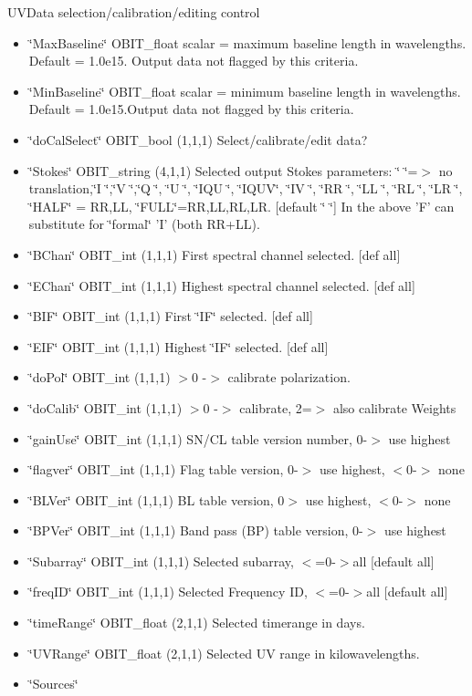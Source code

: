 UVData selection/calibration/editing control \begin{itemize}
\item \char`\"{}Max\-Baseline\char`\"{} OBIT\_\-float scalar = maximum baseline length in wavelengths. Default = 1.0e15. Output data not flagged by this criteria. \item \char`\"{}Min\-Baseline\char`\"{} OBIT\_\-float scalar = minimum baseline length in wavelengths. Default = 1.0e15.Output data not flagged by this criteria. \item \char`\"{}do\-Cal\-Select\char`\"{} OBIT\_\-bool (1,1,1) Select/calibrate/edit data? \item \char`\"{}Stokes\char`\"{} OBIT\_\-string (4,1,1) Selected output Stokes parameters: \char`\"{}    \char`\"{}=$>$ no translation,\char`\"{}I   \char`\"{},\char`\"{}V   \char`\"{},\char`\"{}Q   \char`\"{}, \char`\"{}U   \char`\"{}, \char`\"{}IQU \char`\"{}, \char`\"{}IQUV\char`\"{}, \char`\"{}IV  \char`\"{}, \char`\"{}RR  \char`\"{}, \char`\"{}LL  \char`\"{}, \char`\"{}RL  \char`\"{}, \char`\"{}LR  \char`\"{}, \char`\"{}HALF\char`\"{} = RR,LL, \char`\"{}FULL\char`\"{}=RR,LL,RL,LR. [default \char`\"{}    \char`\"{}] In the above 'F' can substitute for \char`\"{}formal\char`\"{} 'I' (both RR+LL). \item \char`\"{}BChan\char`\"{} OBIT\_\-int (1,1,1) First spectral channel selected. [def all] \item \char`\"{}EChan\char`\"{} OBIT\_\-int (1,1,1) Highest spectral channel selected. [def all] \item \char`\"{}BIF\char`\"{} OBIT\_\-int (1,1,1) First \char`\"{}IF\char`\"{} selected. [def all] \item \char`\"{}EIF\char`\"{} OBIT\_\-int (1,1,1) Highest \char`\"{}IF\char`\"{} selected. [def all] \item \char`\"{}do\-Pol\char`\"{} OBIT\_\-int (1,1,1) $>$0 -$>$ calibrate polarization. \item \char`\"{}do\-Calib\char`\"{} OBIT\_\-int (1,1,1) $>$0 -$>$ calibrate, 2=$>$ also calibrate Weights \item \char`\"{}gain\-Use\char`\"{} OBIT\_\-int (1,1,1) SN/CL table version number, 0-$>$ use highest \item \char`\"{}flagver\char`\"{} OBIT\_\-int (1,1,1) Flag table version, 0-$>$ use highest, $<$0-$>$ none \item \char`\"{}BLVer\char`\"{} OBIT\_\-int (1,1,1) BL table version, 0$>$ use highest, $<$0-$>$ none \item \char`\"{}BPVer\char`\"{} OBIT\_\-int (1,1,1) Band pass (BP) table version, 0-$>$ use highest \item \char`\"{}Subarray\char`\"{} OBIT\_\-int (1,1,1) Selected subarray, $<$=0-$>$all [default all] \item \char`\"{}freq\-ID\char`\"{} OBIT\_\-int (1,1,1) Selected Frequency ID, $<$=0-$>$all [default all] \item \char`\"{}time\-Range\char`\"{} OBIT\_\-float (2,1,1) Selected timerange in days. \item \char`\"{}UVRange\char`\"{} OBIT\_\-float (2,1,1) Selected UV range in kilowavelengths. \item \char`\"{}Sources\char`\"{} 
\end{itemize}
